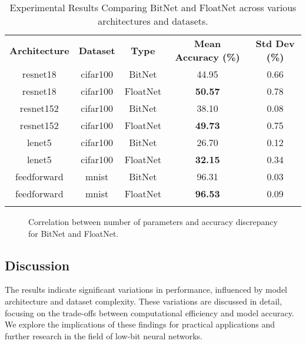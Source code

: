 \documentclass{article}
\begin{document}
\begin{table}[h]
\centering
\begin{tabular}{|c|c|c|c|c|}
\Xhline{2\arrayrulewidth}
\textbf{Architecture} & \textbf{Dataset} & \textbf{Type} & \textbf{Mean Accuracy (\%)} & \textbf{Std Dev (\%)} \\
\Xhline{2\arrayrulewidth}
resnet18 & cifar100 & BitNet & 44.95 & 0.66 \\
resnet18 & cifar100 & FloatNet & \textbf{50.57} & 0.78 \\
\Xhline{2\arrayrulewidth}
resnet152 & cifar100 & BitNet & 38.10 & 0.08 \\
resnet152 & cifar100 & FloatNet & \textbf{49.73} & 0.75 \\
\Xhline{2\arrayrulewidth}
lenet5 & cifar100 & BitNet & 26.70 & 0.12 \\
lenet5 & cifar100 & FloatNet & \textbf{32.15} & 0.34 \\
\Xhline{2\arrayrulewidth}
feedforward & mnist & BitNet & 96.31 & 0.03 \\
feedforward & mnist & FloatNet & \textbf{96.53} & 0.09 \\
\Xhline{2\arrayrulewidth}
\end{tabular}
\caption{Experimental Results Comparing BitNet and FloatNet across various architectures and datasets.}
\label{tab:results}
\end{table}

\begin{figure}[h]
\centering
{}
\caption{Correlation between number of parameters and accuracy discrepancy for BitNet and FloatNet.}
\label{fig:discrepancy_plot}
\end{figure}


\subsection{Discussion}

The results indicate significant variations in performance, influenced by model architecture and dataset complexity. These variations are discussed in detail, focusing on the trade-offs between computational efficiency and model accuracy. We explore the implications of these findings for practical applications and further research in the field of low-bit neural networks.





\end{document}
